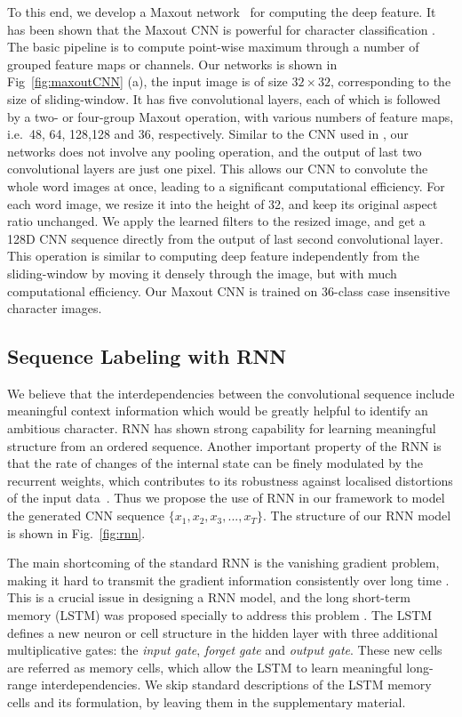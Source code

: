 \documentclass[letterpaper]{article}
\begin{document}
To this end, we develop a Maxout network~\cite{Goodfellow2013} for computing the deep feature. It has been shown that the Maxout CNN is powerful for character classification \cite{Jaderberg2014,Alsharif2013}. The basic pipeline is to compute point-wise maximum through a number of grouped feature maps or channels. Our networks is shown in Fig~\ref{fig:maxoutCNN} (a), the input image is of size $32 \times 32$, corresponding to the size of sliding-window. It has five convolutional layers, each of which is followed by a two- or four-group Maxout operation, with various numbers of feature maps, i.e.\ 48, 64, 128,128 and 36, respectively. Similar to the CNN used in \cite{Jaderberg2014}, our networks does not involve any pooling operation, and the output of last two convolutional layers are just one pixel. This allows our CNN to convolute the whole word images at once, leading to a significant computational efficiency. For each word image, we resize it into the  height of 32, and keep its original aspect ratio unchanged. We apply the learned filters to the resized image, and get a 128D CNN sequence directly from the output of last second convolutional layer. This operation is similar to computing deep feature independently from the sliding-window by moving it densely through the image, but with much computational efficiency. Our Maxout CNN is trained on 36-class case insensitive character images.




\subsection{Sequence Labeling with RNN}
We believe that the interdependencies between the convolutional sequence include meaningful context information which would be greatly helpful to identify an ambitious character.
RNN has shown strong capability for learning meaningful structure from an ordered sequence.
Another important property of the RNN is that the rate of changes of the internal state can be finely modulated by the recurrent weights, which contributes to its robustness against localised distortions of the input data~\cite{Graves2009}.
Thus we propose the use of RNN in our framework to model the generated CNN sequence $\{x_1, x_2, x_3,...,x_T\}$. The structure of our RNN model is shown in Fig.~\ref{fig:rnn}.

The main shortcoming of the standard RNN is the vanishing gradient problem, making it hard to transmit the gradient information consistently over long time \cite{Hochreiter1997}. This is a crucial issue in designing a RNN model, and the long short-term memory (LSTM) was proposed specially to address this problem \cite{Hochreiter1997}. The LSTM defines a new neuron or cell structure in the hidden layer with three additional multiplicative gates: the \emph{input gate}, \emph{forget gate} and \emph{output gate}. These new cells are referred as memory cells, which allow the LSTM to learn meaningful long-range interdependencies.
We skip standard descriptions of the LSTM memory cells and its formulation, by leaving them in the supplementary material.
\end{document}
